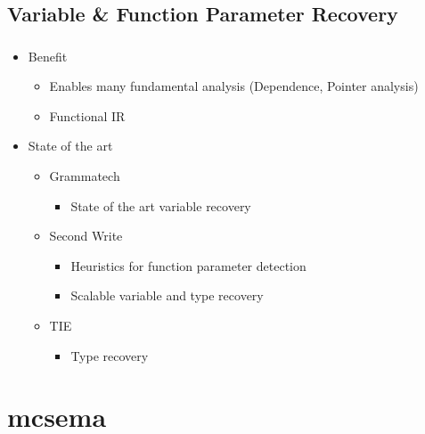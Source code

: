 \documentclass[mathserif,10pt]{beamer}
\begin{document}
  \subsection{Variable \& Function Parameter Recovery}
  \frame
  {
    \frametitle{\subsecname}
    \begin{itemize}
      \item Benefit
        \begin{itemize}
          \item Enables many fundamental analysis (Dependence, Pointer analysis)
          \item Functional IR
        \end{itemize}
      \item State of the art
        \begin{itemize}
          \item Grammatech
            \begin{itemize}
              \item State of the art variable recovery
            \end{itemize}     
          \item Second Write 
            \begin{itemize}
              \item Heuristics for function parameter detection
              \item Scalable variable and type recovery
            \end{itemize}     
          \item TIE
            \begin{itemize}
              \item Type recovery
            \end{itemize}     
        \end{itemize}
    \end{itemize}

  }


\section{mcsema}
\end{document}
